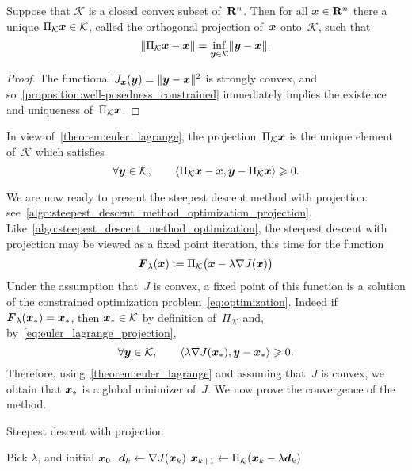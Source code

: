 \begin{proposition}
    Suppose that $\mathcal K$ is a closed convex subset of~$\mathbf R^n$.
    Then for all $\mathbf{\boldsymbol{x}} \in \mathbf R^n$ there a unique $\Pi_{\mathcal K} \mathbf{\boldsymbol{x}} \in \mathcal K$,
    called the orthogonal projection of~$\mathbf{\boldsymbol{x}}$ onto~$\mathcal K$,
    such that
    \[
        \lVert\Pi_{\mathcal K} \mathbf{\boldsymbol{x}} - \mathbf{\boldsymbol{x}}\rVert = \inf_{\mathbf{\boldsymbol{y}} \in \mathcal K} \lVert\mathbf{\boldsymbol{y}} - \mathbf{\boldsymbol{x}}\rVert.
    \]
\end{proposition}
\begin{proof}
    The functional $J_{\mathbf{\boldsymbol{x}}}(\mathbf{\boldsymbol{y}}) = \lVert\mathbf{\boldsymbol{y}} - \mathbf{\boldsymbol{x}}\rVert^2$ is strongly convex,
    and so~\cref{proposition:well-posedness_constrained} immediately implies the existence and uniqueness of~$\Pi_{\mathcal K} \mathbf{\boldsymbol{x}}$.
\end{proof}

\begin{remark}
    In view of~\cref{theorem:euler_lagrange},
    the projection~$\Pi_{\mathcal K} \mathbf{\boldsymbol{x}}$ is the unique element of~$\mathcal K$ which satisfies
    \begin{equation}
        \label{eq:euler_lagrange_projection}
        \forall \mathbf{\boldsymbol{y}} \in \mathcal K,
        \qquad \langle\Pi_{\mathcal K} \mathbf{\boldsymbol{x}} - \mathbf{\boldsymbol{x}}, \mathbf{\boldsymbol{y}} - \Pi_{\mathcal K}\mathbf{\boldsymbol{x}}\rangle \geqslant 0.
    \end{equation}
\end{remark}

We are now ready to present the steepest descent method with projection:
see~\cref{algo:steepest_descent_method_optimization_projection}.
Like~\cref{algo:steepest_descent_method_optimization},
the steepest descent with projection may be viewed as a fixed point iteration,
this time for the function
\begin{equation}
    \label{eq:constrained_fixed_point}
    \mathbf{\boldsymbol{F}}_{\lambda}(\mathbf{\boldsymbol{x}}) := \Pi_{\mathcal K}\bigl(\mathbf{\boldsymbol{x}} - \lambda \nabla J(\mathbf{\boldsymbol{x}})\bigr)
\end{equation}
Under the assumption that~$J$ is convex,
a fixed point of this function is a solution of the constrained optimization problem~\eqref{eq:optimization}.
Indeed if~$\mathbf{\boldsymbol{F}}_{\lambda}(\mathbf{\boldsymbol{x}}_*) = \mathbf{\boldsymbol{x}}_*$,
then $\mathbf{\boldsymbol{x}}_* \in \mathcal K$ by definition of~$\Pi_{\mathcal K}$ and, by~\eqref{eq:euler_lagrange_projection},
\[
    \forall \mathbf{\boldsymbol{y}} \in \mathcal K,
    \qquad \langle\lambda \nabla J(\mathbf{\boldsymbol{x}}_*), \mathbf{\boldsymbol{y}} - \mathbf{\boldsymbol{x}}_*\rangle \geqslant 0.
\]
Therefore, using~\cref{theorem:euler_lagrange} and assuming that~$J$ is convex,
we obtain that $\mathbf{\boldsymbol{x}}_*$ is a global minimizer of~$J$.
We now prove the convergence of the method.
\begin{algorithm}
\caption{Steepest descent with projection}%
\label{algo:steepest_descent_method_optimization_projection}%
\begin{algorithmic}[1]
    \State Pick $\lambda$, and initial $\mathbf{\boldsymbol{x}}_0$.
        \State $\mathbf{\boldsymbol{d}}_k \gets \nabla J(\mathbf{\boldsymbol{x}}_k)$
        \State $\mathbf{\boldsymbol{x}}_{k+1} \gets \Pi_{\mathcal K}(\mathbf{\boldsymbol{x}}_{k} - \lambda \mathbf{\boldsymbol{d}}_k)$
    \EndFor
\end{algorithmic}
\end{algorithm}

